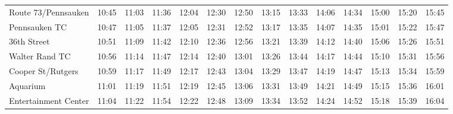 \begin{center}
\begin{tabular}{@{}lrrrrrrrrrrrrr@{}}
Route 73/Pennsauken & 10:45 & 11:03 & 11:36 & 12:04 & 12:30 & 12:50 & 13:15 & 13:33 & 14:06 & 14:34 & 15:00 & 15:20 & 15:45 \\
Pennsauken TC & 10:47 & 11:05 & 11:37 & 12:05 & 12:31 & 12:52 & 13:17 & 13:35 & 14:07 & 14:35 & 15:01 & 15:22 & 15:47 \\
36th Street & 10:51 & 11:09 & 11:42 & 12:10 & 12:36 & 12:56 & 13:21 & 13:39 & 14:12 & 14:40 & 15:06 & 15:26 & 15:51 \\
Walter Rand TC & 10:56 & 11:14 & 11:47 & 12:14 & 12:40 & 13:01 & 13:26 & 13:44 & 14:17 & 14:44 & 15:10 & 15:31 & 15:56 \\
Cooper St/Rutgers & 10:59 & 11:17 & 11:49 & 12:17 & 12:43 & 13:04 & 13:29 & 13:47 & 14:19 & 14:47 & 15:13 & 15:34 & 15:59 \\
Aquarium & 11:01 & 11:19 & 11:51 & 12:19 & 12:45 & 13:06 & 13:31 & 13:49 & 14:21 & 14:49 & 15:15 & 15:36 & 16:01 \\
Entertainment Center & 11:04 & 11:22 & 11:54 & 12:22 & 12:48 & 13:09 & 13:34 & 13:52 & 14:24 & 14:52 & 15:18 & 15:39 & 16:04 \\
\bottomrule\end{tabular}\end{center}
